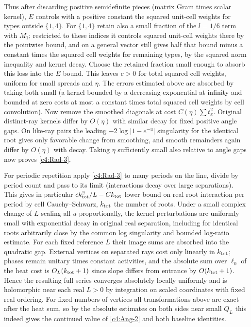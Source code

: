 Thus after discarding positive semidefinite pieces (matrix Gram times scalar kernel), \(E\) controls with a positive constant the squared unit-cell weights for types outside \(\{1,4\}\). For \(\{1,4\}\) retain also a small fraction of the \(l=1/6\) term with \(M_1\); restricted to these indices it controls squared unit-cell weights there by the pointwise bound, and on a general vector still gives half that bound minus a constant times the squared cell weights for remaining types, by the squared norm inequality and kernel decay. Choose the retained fraction small enough to absorb this loss into the \(E\) bound. This leaves \(c>0\) for total squared cell weights, uniform for small spreads and \(\eta\). The errors estimated above are absorbed by taking both small (a kernel bounded by a decreasing exponential at infinity and bounded at zero costs at most a constant times total squared cell weights by cell convolution). Now remove the smoothed diagonals at cost \(C(\eta)\sum t_x^2\). Original distinct-ray kernels differ by \(O(\eta)\) with similar decay for fixed positive angle gaps. On like-ray pairs the leading \(-2\log|1-e^{-u}|\) singularity for the identical root gives only favorable change from smoothing, and smooth remainders again differ by \(O(\eta)\) with decay. Taking \(\eta\) sufficiently small also relative to angle gaps now proves \eqref{c4:Rad-3}.

For periodic repetition apply \eqref{c4:Rad-3} to many periods on the line, divide by period count and pass to its limit (interactions decay over large separations). This gives in particular \(c k_{\rm tot}^2/L-C k_{\rm tot}\) lower bound on real root interaction per period by cell Cauchy--Schwarz, \(k_{\rm tot}\) the number of roots. Under a small complex change of \(L\) scaling all \(u\) proportionally, the kernel perturbations are uniformly small with exponential decay in original real separation, including for identical roots arbitrarily close by the common log singularity and bounded log-ratio estimate. For each fixed reference \(L\) their image sums are absorbed into the quadratic gap. External vertices on separated rays cost only linearly in \(k_{\rm tot}\); phases remain unitary times constant activities, and the absolute sum over \(\ell_0\) of the heat cost is \(O_L(k_{\rm tot}+1)\) since slope differs from entrance by \(O(k_{\rm tot}+1)\). Hence the resulting full series converges absolutely locally uniformly and is holomorphic near each real \(L>0\) by integration on scaled coordinates with fixed real ordering. For fixed numbers of vertices all transformations above are exact after the heat sum, so by the absolute estimates on both sides near small \(Q_L\) this indeed gives the continued value of \eqref{c4:Ang-2} and both baseline identities.

